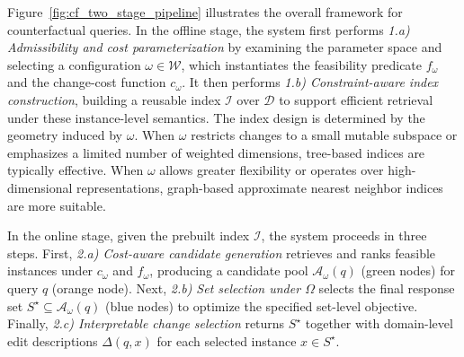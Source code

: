 Figure~\ref{fig:cf_two_stage_pipeline} illustrates the overall framework for counterfactual queries. In the offline stage, the system first performs \emph{1.a) Admissibility and cost parameterization} by examining the parameter space and selecting a configuration $\omega \in \mathcal{W}$, which instantiates the feasibility predicate $f_\omega$ and the change-cost function $c_\omega$. It then performs \emph{1.b) Constraint-aware index construction}, building a reusable index $\mathcal{I}$ over $\mathcal{D}$ to support efficient retrieval under these instance-level semantics. The index design is determined by the geometry induced by $\omega$. When $\omega$ restricts changes to a small mutable subspace or emphasizes a limited number of weighted dimensions, tree-based indices are typically effective. When $\omega$ allows greater flexibility or operates over high-dimensional representations, graph-based approximate nearest neighbor indices are more suitable.

In the online stage, given the prebuilt index $\mathcal{I}$, the system proceeds in three steps. First, \emph{2.a) Cost-aware candidate generation} retrieves and ranks feasible instances under $c_\omega$ and $f_\omega$, producing a candidate pool $\mathcal{A}_\omega(q)$ (green nodes) for query $q$ (orange node). Next, \emph{2.b) Set selection under $\Omega$} selects the final response set $S^\star \subseteq \mathcal{A}_\omega(q)$ (blue nodes) to optimize the specified set-level objective. Finally, \emph{2.c) Interpretable change selection} returns $S^\star$ together with domain-level edit descriptions $\Delta(q,x)$ for each selected instance $x \in S^\star$.